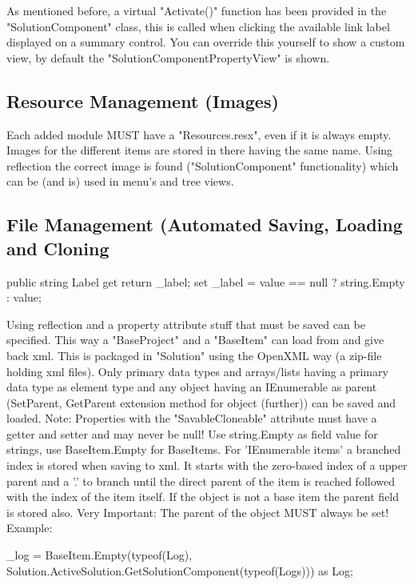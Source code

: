 As mentioned before, a virtual "Activate()" function has been provided in the "SolutionComponent" class, this is called when clicking the available link label displayed on a summary  control. You can override this yourself to show a custom view, by  default the "SolutionComponentPropertyView" is shown.

\subsection{Resource Management (Images)}
Each added module MUST have a "Resources.resx", even if it is always empty. Images for the different items are stored in there having the same name. Using reflection the correct image is found ("SolutionComponent" functionality) which can be (and is) used in menu's and tree views.
\begin{codelisting}
public Image GetImage(){...
\end{codelisting}

\subsection{File Management (Automated Saving, Loading and Cloning}
\begin{codelisting}
public string Label
{
get { return _label; }
      set { _label = value == null ? string.Empty : value; }
}
\end{codelisting}

Using reflection and a property attribute stuff that must be saved can be specified. This way a "BaseProject" and a "BaseItem" can load from and give back xml. This is packaged in "Solution" using the OpenXML way (a zip-file holding xml files). 
Only primary data types and arrays/lists having a primary data type as element type and any object having an IEnumerable as parent (SetParent, GetParent extension method for object (further))  can be saved and loaded.
Note: Properties with the "SavableCloneable" attribute must have a getter and setter and may never be null! Use string.Empty as field value for strings, use BaseItem.Empty for BaseItems.
For 'IEnumerable items' a branched index is stored when saving to xml. It starts with the zero-based index of a upper parent and a '.' to branch until the direct parent of the item is reached followed with the index of the item itself. 
If the object is not a base item the parent field is stored also. Very Important: The parent of the object MUST always be set!
Example: 
\begin{codelisting}
_log = BaseItem.Empty(typeof(Log), Solution.ActiveSolution.GetSolutionComponent(typeof(Logs))) as Log;
\end{codelisting}

